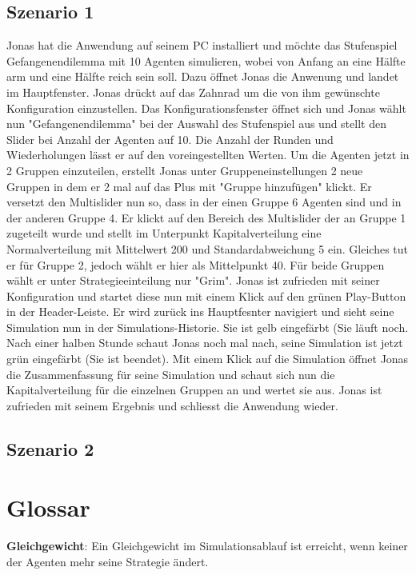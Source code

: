 \documentclass[parskip=full,11pt]{scrartcl}
\begin{document}
\subsection{Szenario 1}
Jonas hat die Anwendung auf seinem PC installiert und möchte das Stufenspiel Gefangenendilemma mit 10 Agenten simulieren, wobei von Anfang an eine Hälfte arm und eine Hälfte reich sein soll. Dazu öffnet Jonas die Anwenung und landet im Hauptfenster. Jonas drückt auf das Zahnrad um die von ihm gewünschte Konfiguration einzustellen. Das Konfigurationsfenster öffnet sich und Jonas wählt nun "Gefangenendilemma" bei der Auswahl des Stufenspiel aus und stellt den Slider bei Anzahl der Agenten auf 10. Die Anzahl der Runden und Wiederholungen lässt er auf den voreingestellten Werten. 
Um die Agenten jetzt in 2 Gruppen einzuteilen, erstellt Jonas unter Gruppeneinstellungen 2 neue Gruppen in dem er 2 mal auf das Plus mit "Gruppe hinzufügen" klickt. Er versetzt den Multislider nun so, dass in der einen Gruppe 6 Agenten sind und in der anderen Gruppe 4. Er klickt auf den Bereich des Multislider der an Gruppe 1 zugeteilt wurde und stellt im Unterpunkt Kapitalverteilung eine Normalverteilung mit Mittelwert 200 und Standardabweichung 5 ein. Gleiches tut er für Gruppe 2, jedoch wählt er hier als Mittelpunkt 40. Für beide Gruppen wählt er unter Strategieeinteilung nur "Grim".
Jonas ist zufrieden mit seiner Konfiguration und startet diese nun mit einem Klick auf den grünen Play-Button in der Header-Leiste.
Er wird zurück ins Hauptfesnter navigiert und sieht seine Simulation nun in der Simulations-Historie. Sie ist gelb eingefärbt (Sie läuft noch. Nach einer halben Stunde schaut Jonas noch mal nach, seine Simulation ist jetzt grün eingefärbt (Sie ist beendet). Mit einem Klick auf die Simulation öffnet Jonas die Zusammenfassung für seine Simulation und schaut sich nun die Kapitalverteilung für die einzelnen Gruppen an und wertet sie aus. Jonas ist zufrieden mit seinem Ergebnis und schliesst die Anwendung wieder.
\subsection{Szenario 2}

\newpage
\section{Glossar}

\textbf{Gleichgewicht}:
Ein Gleichgewicht im Simulationsablauf ist erreicht, wenn keiner der Agenten mehr seine Strategie ändert.
\end{document}
